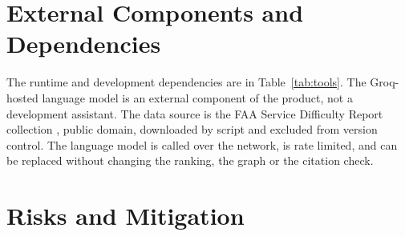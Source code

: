 \section{External Components and Dependencies}
The runtime and development dependencies are in Table~\ref{tab:tools}. The Groq-hosted language model is an external component of the product, not a development assistant. The data source is the FAA Service Difficulty Report collection \citep{faa-sdr}, public domain, downloaded by script and excluded from version control. The language model is called over the network, is rate limited, and can be replaced without changing the ranking, the graph or the citation check.

\section{Risks and Mitigation}\label{sec:risks}
